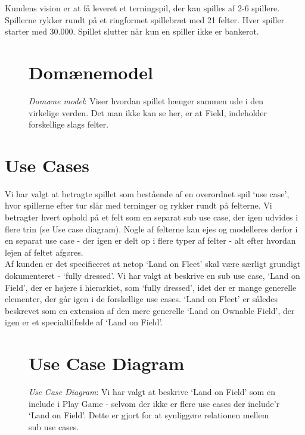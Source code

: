 Kundens vision er at få leveret et terningspil, der kan spilles af 2-6 spillere.
Spillerne rykker rundt på et ringformet spillebræt med 21 felter. Hver spiller
starter med 30.000. Spillet slutter når kun en spiller ikke er bankerot.\\
\FloatBarrier
\begin{figure}[h]
\section*{Domænemodel}
\centering
{}
\caption{\emph{Domæne model}: Viser hvordan spillet hænger sammen ude i den
virkelige verden. Det man ikke kan se her, er at Field, indeholder forskellige slags
felter.}
\end{figure}
\FloatBarrier
\section*{Use Cases}
Vi har valgt at betragte spillet som bestående af en overordnet spil ‘use case’,
hvor spillerne efter tur slår med terninger og rykker rundt på felterne. Vi
betragter hvert ophold på et felt som en separat sub use case, der igen udvides
i flere trin (se Use case diagram). Nogle af felterne kan ejes og modelleres
derfor i en separat use case - der igen er delt op i flere typer af felter - alt
efter hvordan lejen af feltet afgøres.\\
\indent Af kunden er det specificeret at netop ‘Land on Fleet’ skal være særligt
grundigt dokumenteret - ‘fully dressed’. Vi har valgt at beskrive en sub use
case, ‘Land on Field’, der er højere i hierarkiet, som ‘fully dressed’, idet der
er mange generelle elementer, der går igen i de forskellige use cases. ‘Land on
Fleet’ er således beskrevet som en extension af den mere generelle ‘Land on
Ownable Field’, der igen er et specialtilfælde af ‘Land on Field’.\\
\FloatBarrier
\begin{figure}[h]
\section*{Use Case Diagram}
\centering
{}
\caption{\emph{Use Case Diagram}: Vi har valgt at beskrive ‘Land on Field’ som
en include i Play Game - selvom der ikke er flere use cases der include’r ‘Land on
Field’. Dette er gjort for at synliggøre relationen mellem sub use cases.}
\end{figure}
\FloatBarrier

